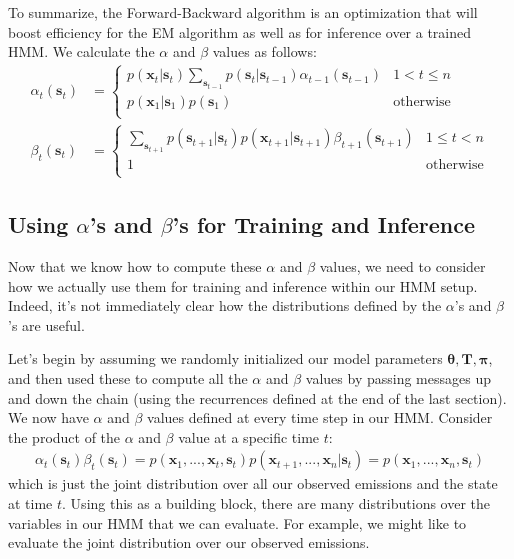 To summarize, the Forward-Backward algorithm is an optimization that will boost efficiency for the EM algorithm as well as for inference over a trained HMM. We calculate the $\alpha$ and $\beta$ values as follows:
\begin{align*}
	\alpha_t(\textbf{s}_t) &=
	\begin{cases} 
      p(\textbf{x}_t | \textbf{s}_t) \sum_{\textbf{s}_{t-1}} p(\textbf{s}_t | \textbf{s}_{t-1}) \alpha_{t-1}(\textbf{s}_{t-1}) & 1 < t \leq n \\
      p(\textbf{x}_1 | \textbf{s}_{1}) p(\textbf{s}_1) & \text{otherwise} \\
   \end{cases} \\
   \beta_t(\textbf{s}_t) &=
   \begin{cases} 
      \sum_{\textbf{s}_{t+1}} p(\textbf{s}_{t+1} | \textbf{s}_t) p(\textbf{x}_{t+1} | \textbf{s}_{t+1}) \beta_{t+1}(\textbf{s}_{t+1}) & 1 \leq t < n \\
      1 & \text{otherwise} \\
   \end{cases}
\end{align*}

\subsection{Using $\alpha$'s and $\beta$'s for Training and Inference}
Now that we know how to compute these $\alpha$ and $\beta$ values, we need to consider how we actually use them for training and inference within our HMM setup. Indeed, it's not immediately clear how the distributions defined by the $\alpha$'s and $\beta$'s are useful.

Let's begin by assuming we randomly initialized our model parameters $\boldsymbol{\theta}, \textbf{T}, \boldsymbol{\pi}$, and then used these to compute all the $\alpha$ and $\beta$ values by passing messages up and down the chain (using the recurrences defined at the end of the last section). We now have $\alpha$ and $\beta$ values defined at every time step in our HMM. Consider the product of the $\alpha$ and $\beta$ value at a specific time $t$:
\begin{align*}
	\alpha_t(\textbf{s}_t) \beta_t(\textbf{s}_t) = p(\textbf{x}_1, ..., \textbf{x}_t, \textbf{s}_t) p(\textbf{x}_{t+1}, ..., \textbf{x}_n | \textbf{s}_t) = p(\textbf{x}_1, ..., \textbf{x}_n, \textbf{s}_t)
\end{align*}
which is just the joint distribution over all our observed emissions and the state at time $t$. Using this as a building block, there are many distributions over the variables in our HMM that we can evaluate. For example, we might like to evaluate the joint distribution over our observed emissions.

